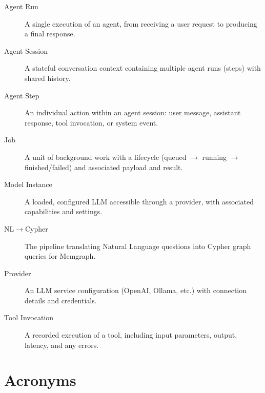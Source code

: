 \documentclass[a4paper,twoside]{sapthesis}
\begin{document}
\begin{description}

\item[Agent Run]
A single execution of an agent, from receiving a user request to producing a final response.

\item[Agent Session]
A stateful conversation context containing multiple agent runs (steps) with shared history.

\item[Agent Step]
An individual action within an agent session: user message, assistant response, tool invocation, or system event.

\item[Job]
A unit of background work with a lifecycle (queued $\rightarrow$ running $\rightarrow$ finished/failed) and associated payload and result.

\item[Model Instance]
A loaded, configured LLM accessible through a provider, with associated capabilities and settings.

\item[NL$\rightarrow$Cypher]
The pipeline translating Natural Language questions into Cypher graph queries for Memgraph.

\item[Provider]
An LLM service configuration (OpenAI, Ollama, etc.) with connection details and credentials.

\item[Tool Invocation]
A recorded execution of a tool, including input parameters, output, latency, and any errors.

\end{description}

\section{Acronyms}
\label{app:glossary:acronyms}
\end{document}
